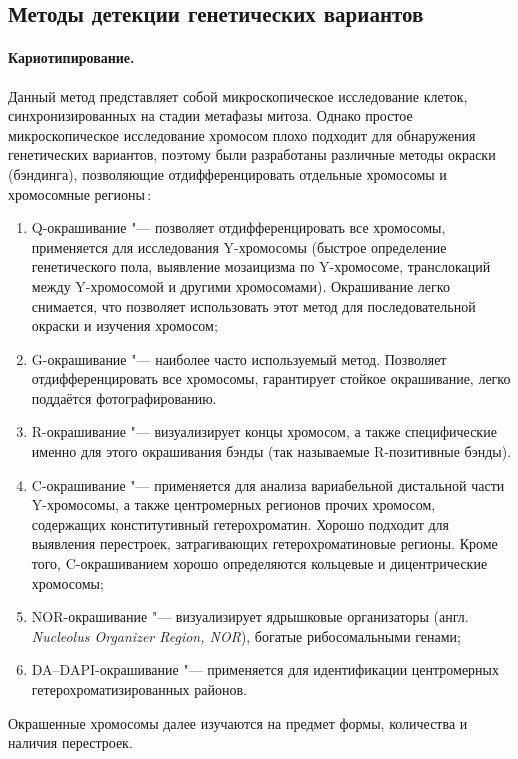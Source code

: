 \documentclass[a4paper,14pt]{extarticle}
\newcommand{\engterm}[1]{англ. \textenglish{\textit{#1}}}
\begin{document}
\subsection{Методы детекции генетических вариантов}

\paragraph{Кариотипирование.}
Данный метод представляет собой микроскопическое исследование клеток, синхронизированных на стадии метафазы митоза.
Однако простое микроскопическое исследование хромосом плохо подходит для обнаружения генетических вариантов, поэтому были разработаны различные методы окраски (бэндинга), позволяющие отдифференцировать отдельные хромосомы и хромосомные регионы\,\citep{Schreck_2001}:

\begin{enumerate}
	\item Q-окрашивание "--- позволяет отдифференцировать все хромосомы, применяется для исследования Y-хромосомы (быстрое определение генетического пола, выявление мозаицизма по Y-хромосоме, транслокаций между Y-хромосомой и другими хромосомами).
	      Окрашивание легко снимается, что позволяет использовать этот метод для последовательной окраски и изучения хромосом;
	\item G-окрашивание "--- наиболее часто используемый метод.
	      Позволяет отдифференцировать все хромосомы, гарантирует стойкое окрашивание, легко поддаётся фотографированию.
	\item R-окрашивание "--- визуализирует концы хромосом, а также специфические именно для этого окрашивания бэнды (так называемые R\hyp{}позитивные бэнды).
	\item C-окрашивание "--- применяется для анализа вариабельной дистальной части Y-хромосомы, а также центромерных регионов прочих хромосом, содержащих конститутивный гетерохроматин.
	      Хорошо подходит для выявления перестроек, затрагивающих гетерохроматиновые регионы.
	      Кроме того, C-окрашиванием хорошо определяются кольцевые и дицентрические хромосомы;
	\item NOR-окрашивание "--- визуализирует ядрышковые организаторы (\engterm{Nucleolus Organizer Region, NOR}), богатые рибосомальными генами;
	\item DA--DAPI-окрашивание "--- применяется для идентификации центромерных гетерохроматизированных районов.
\end{enumerate}

Окрашенные хромосомы далее изучаются на предмет формы, количества и наличия перестроек.
\end{document}
